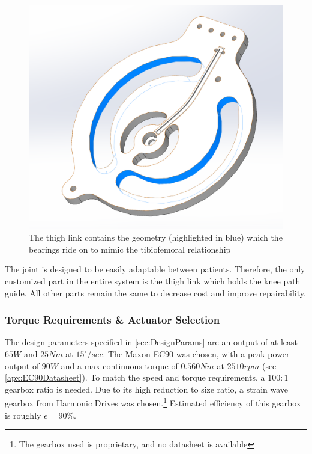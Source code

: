 \begin{figure}[ht!]
    \centering
    \includegraphics[width=0.8\linewidth]{Figures/Design/KneePathGuide.png}
    \caption{The thigh link contains the geometry (highlighted in blue) which the bearings ride on to mimic the tibiofemoral relationship}
    \label{fig:CenterPlateGeometry}
\end{figure}

The joint is designed to be easily adaptable between patients. Therefore, the only customized part in the entire system is the thigh link which holds the knee path guide. All other parts remain the same to decrease cost and improve repairability.

\subsubsection{Torque Requirements \& Actuator Selection}

The design parameters specified in \autoref{sec:DesignParams} are an output of at least \(65 W\) and \(25 Nm\) at \(15^\circ/sec\). The Maxon EC90 was chosen, with a peak power output of \(90W\) and a max continuous torque of \(0.560 Nm\) at \(2510 rpm\) (see \autoref{apx:EC90Datasheet}). To match the speed and torque requirements, a \(100:1\) gearbox ratio is needed. Due to its high reduction to size ratio, a strain wave gearbox from {Harmonic Drives\texttrademark} was chosen.\footnote{The gearbox used is proprietary, and no datasheet is available} Estimated efficiency of this gearbox is roughly \(\epsilon = 90\%\).

